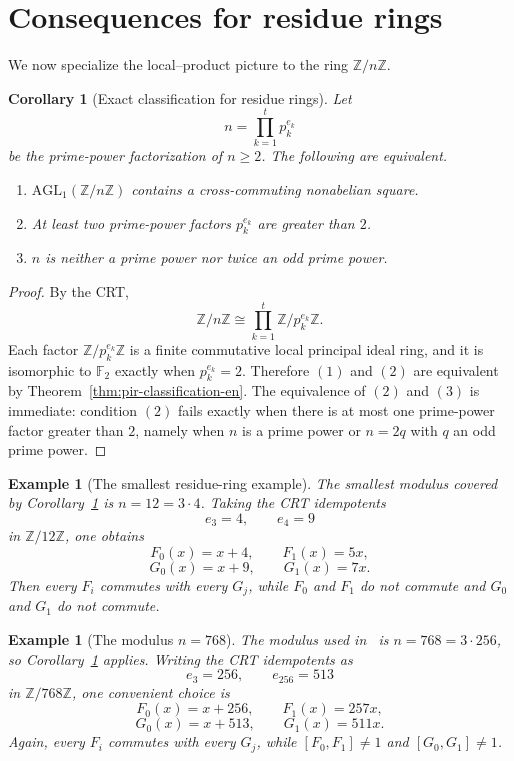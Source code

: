 \documentclass[11pt]{article}
\newcommand{\Z}{\mathbb{Z}}
\newcommand{\AGL}{\mathrm{AGL}_1}
\newcommand{\comm}[2]{[#1,#2]}
\theoremstyle{uprightthm}
\newtheorem{corollary}[theorem]{Corollary}
\newtheorem{example}[theorem]{Example}
\begin{document}
\section{Consequences for residue rings}
We now specialize the local--product picture to the ring $\Z/n\Z$.

\begin{corollary}[Exact classification for residue rings]
\label{cor:zn-consequences-en}
Let
\[
n=\prod_{k=1}^t p_k^{e_k}
\]
be the prime-power factorization of $n\ge 2$. The following are equivalent.
\begin{enumerate}
\item $\AGL(\Z/n\Z)$ contains a cross-commuting nonabelian square.
\item At least two prime-power factors $p_k^{e_k}$ are greater than $2$.
\item $n$ is neither a prime power nor twice an odd prime power.
\end{enumerate}
\end{corollary}

\begin{proof}
By the CRT,
\[
\Z/n\Z \cong \prod_{k=1}^t \Z/p_k^{e_k}\Z.
\]
Each factor $\Z/p_k^{e_k}\Z$ is a finite commutative local principal ideal
ring, and it is isomorphic to $\mathbb F_2$ exactly when $p_k^{e_k}=2$.
Therefore $(1)$ and $(2)$ are equivalent by
Theorem~\ref{thm:pir-classification-en}. The equivalence of $(2)$ and $(3)$ is
immediate: condition $(2)$ fails exactly when there is at most one prime-power
factor greater than $2$, namely when $n$ is a prime power or $n=2q$ with $q$ an
odd prime power.
\end{proof}

\begin{example}[The smallest residue-ring example]
The smallest modulus covered by
Corollary~\ref{cor:zn-consequences-en} is $n=12=3\cdot 4$. Taking the CRT
idempotents
\[
e_3=4,\qquad e_4=9
\]
in $\Z/12\Z$, one obtains
\[
F_0(x)=x+4,\qquad F_1(x)=5x,
\]
\[
G_0(x)=x+9,\qquad G_1(x)=7x.
\]
Then every $F_i$ commutes with every $G_j$, while $F_0$ and $F_1$ do not
commute and $G_0$ and $G_1$ do not commute.
\end{example}

\begin{example}[The modulus $n=768$]
The modulus used in~\cite{Kasai2026} is $n=768=3\cdot 256$, so
Corollary~\ref{cor:zn-consequences-en} applies. Writing the CRT idempotents as
\[
e_3=256,\qquad e_{256}=513
\]
in $\Z/768\Z$, one convenient choice is
\[
F_0(x)=x+256,\qquad F_1(x)=257x,
\]
\[
G_0(x)=x+513,\qquad G_1(x)=511x.
\]
Again, every $F_i$ commutes with every $G_j$, while
$\comm{F_0}{F_1}\ne 1$ and $\comm{G_0}{G_1}\ne 1$.
\end{example}
\end{document}
